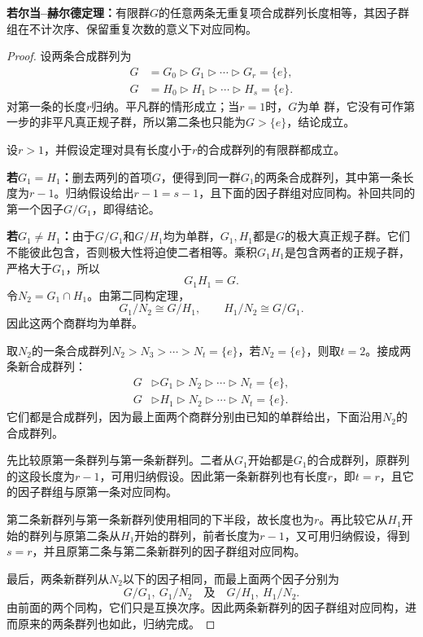 \begin{theorem}\label{p2:jordan-holder}
\textbf{若尔当--赫尔德定理：}有限群$G$的任意两条无重复项合成群列长度相等，其因子群组在不计次序、保留重复次数的意义下对应同构。
\end{theorem}
\begin{proof}
设两条合成群列为
\begin{align*}
G&=G_0\triangleright G_1\triangleright\cdots\triangleright G_r=\{e\},\\
G&=H_0\triangleright H_1\triangleright\cdots\triangleright H_s=\{e\}.
\end{align*}
对第一条的长度$r$归纳。平凡群的情形成立；当$r=1$时，$G$为单 群，它没有可作第一步的非平凡真正规子群，所以第二条也只能为$G>\{e\}$，结论成立。

设$r>1$，并假设定理对具有长度小于$r$的合成群列的有限群都成立。

\textbf{若$G_1=H_1$：}删去两列的首项$G$，便得到同一群$G_1$的两条合成群列，其中第一条长度为$r-1$。归纳假设给出$r-1=s-1$，且下面的因子群组对应同构。补回共同的第一个因子$G/G_1$，即得结论。

\textbf{若$G_1\ne H_1$：}由于$G/G_1$和$G/H_1$均为单群，$G_1,H_1$都是$G$的极大真正规子群。它们不能彼此包含，否则极大性将迫使二者相等。乘积$G_1H_1$是包含两者的正规子群，严格大于$G_1$，所以
\[
G_1H_1=G.
\]
令$N_2=G_1\cap H_1$。由第二同构定理，
\[
G_1/N_2\cong G/H_1,\qquad
H_1/N_2\cong G/G_1.
\]
因此这两个商群均为单群。

取$N_2$的一条合成群列$N_2>N_3>\cdots>N_t=\{e\}$，若$N_2=\{e\}$，则取$t=2$。接成两条新合成群列：
\begin{align*}
G&\triangleright G_1\triangleright N_2\triangleright\cdots\triangleright N_t=\{e\},\\
G&\triangleright H_1\triangleright N_2\triangleright\cdots\triangleright N_t=\{e\}.
\end{align*}
它们都是合成群列，因为最上面两个商群分别由已知的单群给出，下面沿用$N_2$的合成群列。

先比较原第一条群列与第一条新群列。二者从$G_1$开始都是$G_1$的合成群列，原群列的这段长度为$r-1$，可用归纳假设。因此第一条新群列也有长度$r$，即$t=r$，且它的因子群组与原第一条对应同构。

第二条新群列与第一条新群列使用相同的下半段，故长度也为$r$。再比较它从$H_1$开始的群列与原第二条从$H_1$开始的群列，前者长度为$r-1$，又可用归纳假设，得到$s=r$，并且原第二条与第二条新群列的因子群组对应同构。

最后，两条新群列从$N_2$以下的因子相同，而最上面两个因子分别为
\[
G/G_1,\ G_1/N_2
\quad\text{及}\quad
G/H_1,\ H_1/N_2.
\]
由前面的两个同构，它们只是互换次序。因此两条新群列的因子群组对应同构，进而原来的两条群列也如此，归纳完成。
\end{proof}



